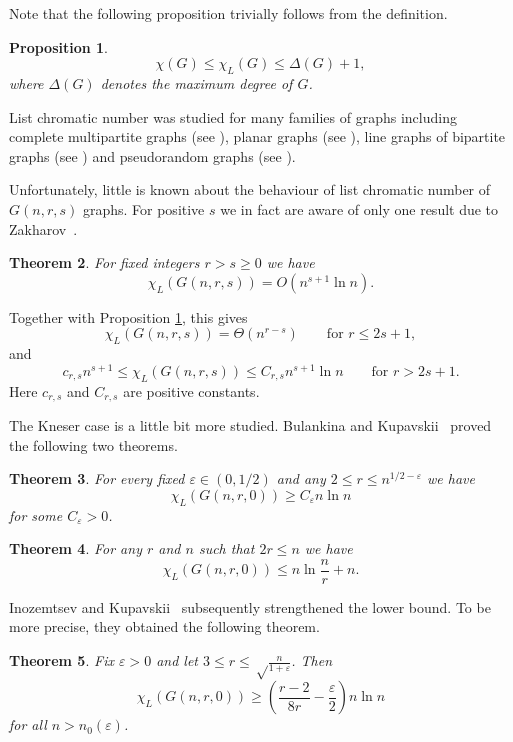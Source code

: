 \documentclass[10pt,a4paper]{article}
\newtheorem{theorem}{Theorem}
\newtheorem{proposition}[theorem]{Proposition}
\theoremstyle{remark}
\theoremstyle{definition}
\newcommand{\skob}[1]{\left(#1\right)}
\begin{document}
Note that the following proposition trivially follows from the definition.

\begin{proposition}\label{trivial}
$$
\chi(G)\le\chi_L(G)\le\Delta(G)+1,
$$
where $\Delta(G)$ denotes the maximum degree of $G$.
\end{proposition}

List chromatic number was studied for many families of graphs including complete multipartite graphs (see \cite{Alon1992, Shabanov2011}), planar graphs (see \cite{Thomassen1994}), line graphs of bipartite graphs (see \cite{Galvin1995}) and pseudorandom graphs (see \cite{SpLChr}).

Unfortunately, little is known about the behaviour of list chromatic number of $G(n,r,s)$ graphs. For positive $s$ we in fact are aware of only one result due to  Zakharov~\cite{ZChrom}.

\begin{theorem}
    \label{Zakharov}
    For fixed integers $r > s \geq 0$ we have
    $$
    \chi_L(G(n,r,s))=O(n^{s+1}\ln n).
    $$
\end{theorem}

Together with Proposition \ref{trivial}, this gives
$$
\chi_L(G(n,r,s))=\Theta(n^{r-s})
\qquad\text{for }r\leq2s+1,
$$
and
$$
c_{r,s}n^{s+1}\leq\chi_L(G(n,r,s))
\leq C_{r,s}n^{s+1}\ln n \qquad\text{for }r > 2s+1.
$$
Here $c_{r,s}$ and $C_{r,s}$ are positive constants.

The Kneser case is a little bit more studied.
Bulankina and Kupavskii~\cite{BulKup} proved the following two theorems.

\begin{theorem}\label{Low1}
    For every fixed $\varepsilon\in(0,1/2)$ and any $2 \leq r \leq n^{1/2-\varepsilon}$ we have
    $$
        \chi_L(G(n,r,0)) \geq C_{\varepsilon}n\ln n
    $$
    for some $C_\varepsilon > 0$.
\end{theorem}

\begin{theorem}\label{Up}
    For any $r$ and $n$ such that $2r \leq n$ we have
    $$
        \chi_L(G(n,r,0))\le n\ln\frac{n}{r}+n.
    $$
\end{theorem}

Inozemtsev and Kupavskii~\cite{InKup} subsequently strengthened the lower bound. To be more precise, they obtained the following theorem.

\begin{theorem}\label{Low2}
    Fix $\varepsilon > 0$ and let $3 \leq r \leq \sqrt\frac{n}{1+\varepsilon}$. Then
    $$
    \chi_L(G(n,r,0)) \geq \skob{\frac{r-2}{8r}-\frac{\varepsilon}{2}}n\ln n
    $$
    for all $n > n_0(\varepsilon)$.
\end{theorem}
\end{document}
